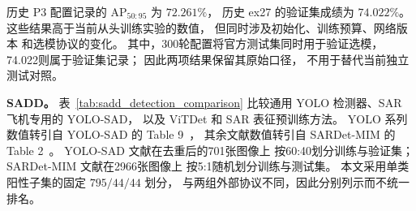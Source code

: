 \documentclass[journal]{IEEEtran}
\begin{document}
历史 P3 配置记录的 AP$_{50:95}$ 为 $72.261\%$，
历史 ex27 的验证集成绩为 $74.022\%$。
这些结果高于当前从头训练实验的数值，
但同时涉及初始化、训练预算、网络版本
和选模协议的变化。
其中，300轮配置将官方测试集同时用于验证选模，
74.022则属于验证集记录；
因此两项结果保留其原始口径，
不用于替代当前独立测试对照。

\textbf{SADD。}
表~\ref{tab:sadd_detection_comparison}
比较通用 YOLO 检测器、SAR 飞机专用的 YOLO-SAD，
以及 ViTDet 和 SAR 表征预训练方法。
YOLO 系列数值转引自 YOLO-SAD 的 Table 9~\cite{yolosad2024}，
其余文献数值转引自 SARDet-MIM 的 Table 2~\cite{sardetmim2026}。
YOLO-SAD 文献在去重后的701张图像上
按60:40划分训练与验证集；
SARDet-MIM 文献在2966张图像上
按5:1随机划分训练与测试集。
本文采用单类阳性子集的固定 $795/44/44$ 划分，
与两组外部协议不同，因此分别列示而不统一排名。
\end{document}
